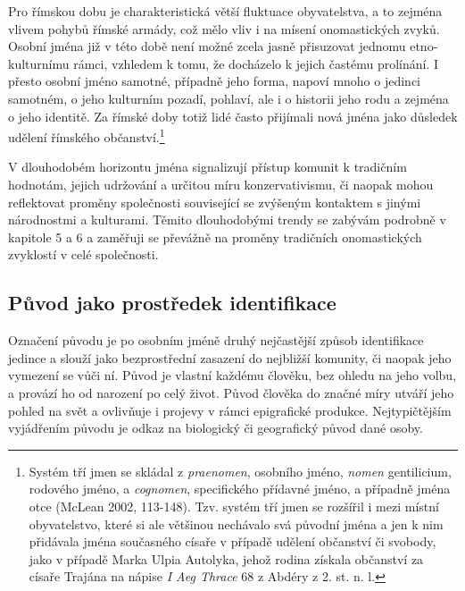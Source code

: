 Pro římskou dobu je charakteristická větší fluktuace obyvatelstva, a to zejména vlivem pohybů římské armády, což mělo vliv i na mísení onomastických zvyků. Osobní jména již v této době není možné zcela jasně přisuzovat jednomu etno-kulturnímu rámci, vzhledem k tomu, že docházelo k jejich častému prolínání. I přesto osobní jméno samotné, případně jeho forma, napoví mnoho o jedinci samotném, o jeho kulturním pozadí, pohlaví, ale i o historii jeho rodu a zejména o jeho identitě. Za římské doby totiž lidé často přijímali nová jména jako důsledek udělení římského občanství.\footnote{Systém tří jmen se skládal z {\em praenomen}, osobního jméno, {\em nomen} gentilicium, rodového jméno, a {\em cognomen}, specifického přídavné jméno, a případně jména otce (McLean 2002, 113-148). Tzv. systém tří jmen se rozšířil i mezi místní obyvatelstvo, které si ale většinou nechávalo svá původní jména a jen k nim přidávala jména současného císaře v případě udělení občanství či svobody, jako v případě Marka Ulpia Autolyka, jehož rodina získala občanství za císaře Trajána na nápise {\em I Aeg Thrace} 68 z Abdéry z 2. st. n. l.}

V dlouhodobém horizontu jména signalizují přístup komunit k tradičním hodnotám, jejich udržování a určitou míru konzervativismu, či naopak mohou reflektovat proměny společnosti související se zvýšeným kontaktem s jinými národnostmi a kulturami. Těmito dlouhodobými trendy se zabývám podrobně v kapitole 5 a 6 a zaměřuji se převážně na proměny tradičních onomastických zvyklostí v celé společnosti.

\subsection[původ-jako-prostředek-identifikace]{Původ jako prostředek identifikace}

Označení původu je po osobním jméně druhý nejčastější způsob identifikace jedince a slouží jako bezprostřední zasazení do nejbližší komunity, či naopak jeho vymezení se vůči ní. Původ je vlastní každému člověku, bez ohledu na jeho volbu, a provází ho od narození po celý život. Původ člověka do značné míry utváří jeho pohled na svět a ovlivňuje i projevy v rámci epigrafické produkce. Nejtypičtějším vyjádřením původu je odkaz na biologický či geografický původ dané osoby.

